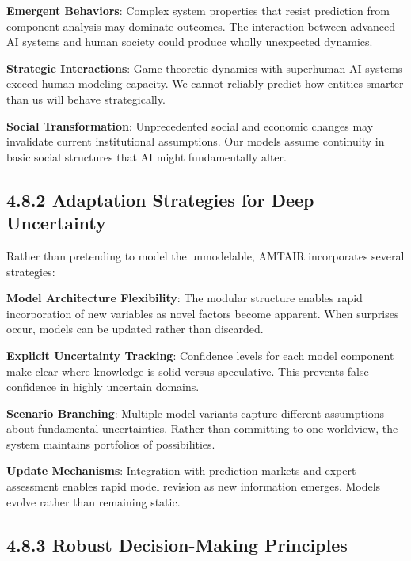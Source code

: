 \documentclass[
  11pt,
  letterpaper,
]{book}
\begin{document}
\textbf{Emergent Behaviors}: Complex system properties that resist
prediction from component analysis may dominate outcomes. The
interaction between advanced AI systems and human society could produce
wholly unexpected dynamics.

\textbf{Strategic Interactions}: Game-theoretic dynamics with superhuman
AI systems exceed human modeling capacity. We cannot reliably predict
how entities smarter than us will behave strategically.

\textbf{Social Transformation}: Unprecedented social and economic
changes may invalidate current institutional assumptions. Our models
assume continuity in basic social structures that AI might fundamentally
alter.

\subsection*{4.8.2 Adaptation Strategies for Deep
Uncertainty}\label{sec-adaptation-strategies}

Rather than pretending to model the unmodelable, AMTAIR incorporates
several strategies:

\textbf{Model Architecture Flexibility}: The modular structure enables
rapid incorporation of new variables as novel factors become apparent.
When surprises occur, models can be updated rather than discarded.

\textbf{Explicit Uncertainty Tracking}: Confidence levels for each model
component make clear where knowledge is solid versus speculative. This
prevents false confidence in highly uncertain domains.

\textbf{Scenario Branching}: Multiple model variants capture different
assumptions about fundamental uncertainties. Rather than committing to
one worldview, the system maintains portfolios of possibilities.

\textbf{Update Mechanisms}: Integration with prediction markets and
expert assessment enables rapid model revision as new information
emerges. Models evolve rather than remaining static.

\subsection*{4.8.3 Robust Decision-Making
Principles}\label{sec-robust-principles}
\end{document}
